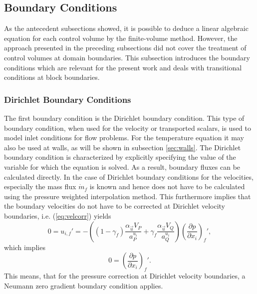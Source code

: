 \subsection{Boundary Conditions}
\label{sec:segboundary}

As the antecedent subsections showed, it is possible to deduce a linear algebraic equation for each control volume by the finite-volume method. However, the approach presented in the preceding subsections did not cover the treatment of control volumes at domain boundaries. This subsection introduces the boundary conditions which are relevant for the present work and deals with transitional conditions at block boundaries.

\subsubsection{Dirichlet Boundary Conditions}
\label{sec:segDirichlet}

The first boundary condition is the Dirichlet boundary condition. This type of boundary condition, when used for the velocity or transported scalars, is used to model inlet conditions for flow problems. For the temperature equation it may also be used at walls, as will be shown in subsection \ref{sec:walls}. The Dirichlet boundary condition is characterized by explicitly specifying the value of the variable for which the equation is solved. As a result, boundary fluxes can be calculated directly. In the case of Dirichlet boundary conditions for the velocities, especially the mass flux \(\dot{m}_f\) is known and hence does not have to be calculated using the pressure weighted interpolation method. This furthermore implies that the boundary velocities do not have to be corrected at Dirichlet velocity boundaries, i.e. (\ref{eq:velcorr}) yields
\begin{displaymath}
  0 
  =
  u_{i,f}' 
  = 
  - \left(\left(1 - \gamma_f\right) \frac{\alpha_\vec{u} V_P}{a_P^{u_i}} + \gamma_f \frac{\alpha_\vec{u} V_Q}{a_Q^{u_i}}\right)
  \left(\frac{\partial p}{\partial x_i}\right)_f',
\end{displaymath}
which implies
\begin{displaymath}
  0 = \left(\frac{\partial p}{\partial x_i}\right)_f'.
\end{displaymath}
This means, that for the pressure correction at Dirichlet velocity boundaries, a Neumann zero gradient boundary condition applies.

